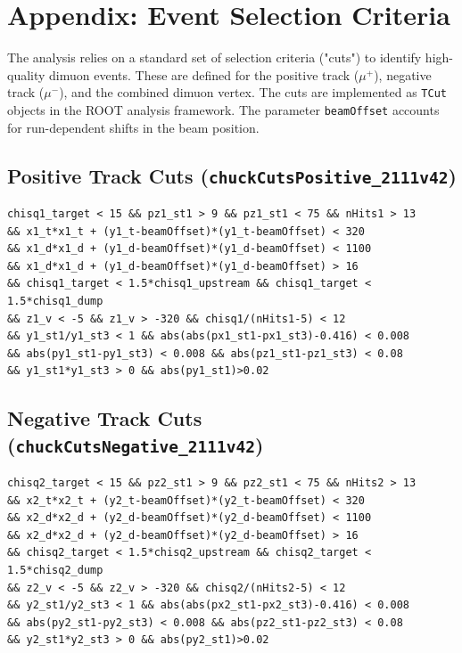 \documentclass[11pt]{article}
\begin{document}
\clearpage

\appendix
\section{Appendix: Event Selection Criteria}
\label{app:event_selection}

The analysis relies on a standard set of selection criteria ("cuts") to identify high-quality dimuon events. These are defined for the positive track ($\mu^+$), negative track ($\mu^-$), and the combined dimuon vertex. The cuts are implemented as \texttt{TCut} objects in the ROOT analysis framework. The parameter \texttt{beamOffset} accounts for run-dependent shifts in the beam position.

\subsection{Positive Track Cuts (\texttt{chuckCutsPositive\_2111v42})}
\label{cut:chuck_positive}
{\small\begin{verbatim}
chisq1_target < 15 && pz1_st1 > 9 && pz1_st1 < 75 && nHits1 > 13
&& x1_t*x1_t + (y1_t-beamOffset)*(y1_t-beamOffset) < 320
&& x1_d*x1_d + (y1_d-beamOffset)*(y1_d-beamOffset) < 1100
&& x1_d*x1_d + (y1_d-beamOffset)*(y1_d-beamOffset) > 16
&& chisq1_target < 1.5*chisq1_upstream && chisq1_target < 1.5*chisq1_dump
&& z1_v < -5 && z1_v > -320 && chisq1/(nHits1-5) < 12
&& y1_st1/y1_st3 < 1 && abs(abs(px1_st1-px1_st3)-0.416) < 0.008
&& abs(py1_st1-py1_st3) < 0.008 && abs(pz1_st1-pz1_st3) < 0.08
&& y1_st1*y1_st3 > 0 && abs(py1_st1)>0.02
\end{verbatim}}

\subsection{Negative Track Cuts (\texttt{chuckCutsNegative\_2111v42})}
\label{cut:chuck_negative}
{\small\begin{verbatim}
chisq2_target < 15 && pz2_st1 > 9 && pz2_st1 < 75 && nHits2 > 13
&& x2_t*x2_t + (y2_t-beamOffset)*(y2_t-beamOffset) < 320
&& x2_d*x2_d + (y2_d-beamOffset)*(y2_d-beamOffset) < 1100
&& x2_d*x2_d + (y2_d-beamOffset)*(y2_d-beamOffset) > 16
&& chisq2_target < 1.5*chisq2_upstream && chisq2_target < 1.5*chisq2_dump
&& z2_v < -5 && z2_v > -320 && chisq2/(nHits2-5) < 12
&& y2_st1/y2_st3 < 1 && abs(abs(px2_st1-px2_st3)-0.416) < 0.008
&& abs(py2_st1-py2_st3) < 0.008 && abs(pz2_st1-pz2_st3) < 0.08
&& y2_st1*y2_st3 > 0 && abs(py2_st1)>0.02
\end{verbatim}}
\end{document}
